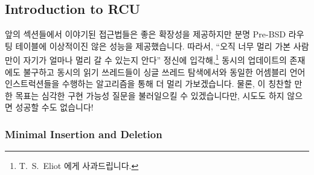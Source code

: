 
\subsection{Introduction to RCU}
\label{sec:defer:Introduction to RCU}

앞의 섹션들에서 이야기된 접근법들은 좋은 확장성을 제공하지만 분명 Pre-BSD
라우팅 테이블에 이상적이진 않은 성능을 제공했습니다.
따라서, ``오직 너무 멀리 가본 사람만이 자기가 얼마나 멀리 갈 수 있는지 안다''
정신에 입각해,\footnote{
	T.~S.~Eliot 에게 사과드립니다.}
동시의 업데이트의 존재에도 불구하고 동시의 읽기 쓰레드들이 싱글 쓰레드
탐색에서와 동일한 어셈블리 언어 인스트럭션들을 수행하는 알고리즘을 통해 더 멀리
가보겠습니다.
물론, 이 칭찬할 만한 목표는 심각한 구현 가능성 질문을 불러일으킬 수
있겠습니다만, 시도도 하지 않으면 성공할 수도 없습니다!

\subsubsection{Minimal Insertion and Deletion}
\label{sec:defer:Minimal Insertion and Deletion}

